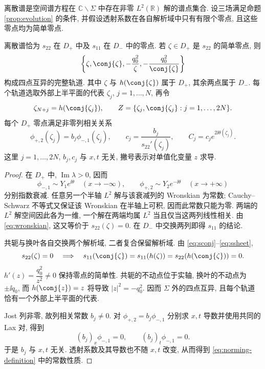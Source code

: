 离散谱是空间谱方程在 $\mathbb C\mathbin{\backslash}\Sigma$ 中存在非零 $L^2(\mathbb R)$ 解的谱点集合. 设三场满足命题 \ref{prop:evolution} 的条件, 并假设透射系数在各自解析域中只有有限个零点, 且这些零点均为简单零点.

\begin{proposition}[四点离散谱轨道]\label{prop:quartet}
离散谱恰为 $s_{22}$ 在 $D_+$ 中及 $s_{11}$ 在 $D_-$ 中的零点. 若 $\zeta\in D_+$ 是 $s_{22}$ 的简单零点, 则
\begin{equation}\label{eq:quartet}
\left\{\zeta,\conj{\zeta},-\dfrac{q_0^2}{\zeta},-\dfrac{q_0^2}{\conj{\zeta}}\right\}
\end{equation}
构成四点互异的完整轨道. 其中 $\zeta$ 与 $h(\conj{\zeta})$ 属于 $D_+$, 其余两点属于 $D_-$. 每个轨道选取外部上半平面的代表 $\zeta_j$, $j=1,\ldots,N$, 再令
\begin{equation}\label{eq:discrete-indexing}
\zeta_{N+j}=h(\conj{\zeta_j}),\qquad
Z=\{\zeta_j,\conj{\zeta_j}:j=1,\ldots,2N\}.
\end{equation}
每个 $D_+$ 零点满足非零列相关关系
\begin{equation}\label{eq:norming-definition}
\phi_{+,2}(\zeta_j)=b_j\phi_{-,1}(\zeta_j),\qquad
c_j=\dfrac{b_j}{s_{22}'(\zeta_j)},\qquad
C_j=c_je^{2\ii\theta(\zeta_j)}.
\end{equation}
这里 $j=1,\ldots,2N$, $b_j,c_j$ 与 $x,t$ 无关, 撇号表示对单值化变量 $z$ 求导.
\end{proposition}
\begin{proof}
在 $D_+$ 中, $\operatorname{Im}\lambda>0$, 因而
\[
\phi_{-,1}\sim Y_1e^{\ii\theta}\quad(x\to-\infty),\qquad
\phi_{+,2}\sim Y_2e^{-\ii\theta}\quad(x\to+\infty)
\]
分别指数衰减. 任意另一个半轴 $L^2$ 解与该衰减列的 Wronskian 为常数; Cauchy--Schwarz 不等式又保证该 Wronskian 在半轴上可积, 因而此常数只能为零. 两端的 $L^2$ 解空间因此各为一维, 一个解在两端均属 $L^2$ 当且仅当这两列线性相关. 由 \eqref{eq:wronskian}, 这又等价于 $s_{22}(\zeta)=0$. 在 $D_-$ 中交换两列即得 $s_{11}$ 的结论.

共轭与换叶各自交换两个解析域, 二者复合保留解析域. 由 \eqref{eq:sconj}--\eqref{eq:ssheet},
\[
s_{22}(\zeta)=0
\quad\Longrightarrow\quad
s_{11}(\conj{\zeta})=s_{11}(h(\zeta))=s_{22}(h(\conj{\zeta}))=0.
\]
$h'(z)=\dfrac{q_0^2}{z^2}\ne0$ 保持零点的简单性. 共轭的不动点位于实轴, 换叶的不动点为 $\pm\ii q_0$, 而 $h(\conj{z})=z$ 将导致 $|z|^2=-q_0^2$. 因而 $\Sigma$ 外的四点互异, 且每个轨道恰有一个外部上半平面的代表.

Jost 列非零, 故列相关常数 $b_j\ne0$. 对 $\phi_{+,2}=b_j\phi_{-,1}$ 分别求 $x,t$ 导数并使用共同的 Lax 对, 得到
\[
(b_j)_x\phi_{-,1}=0,\qquad (b_j)_t\phi_{-,1}=0.
\]
于是 $b_j$ 与 $x,t$ 无关. 透射系数及其导数也不随 $x,t$ 改变, 从而得到 \eqref{eq:norming-definition} 中的常数性质.
\end{proof}


